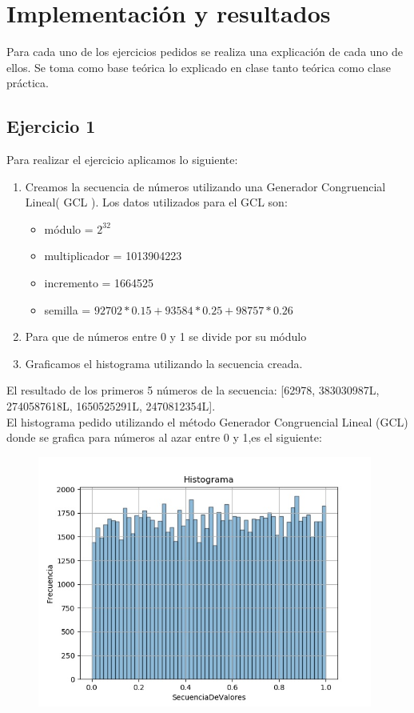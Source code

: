 \documentclass[11pt,a4paper]{article}
\begin{document}
\section{Implementación y resultados}
Para cada uno de los ejercicios pedidos se realiza una explicación de cada uno de ellos. Se toma como base teórica lo explicado en clase tanto teórica como clase práctica.

	\subsection{Ejercicio 1}
	    Para realizar el ejercicio aplicamos lo siguiente:
	    \begin{enumerate}
	        \item Creamos la secuencia de números utilizando una Generador Congruencial Lineal( GCL ). Los datos utilizados para el GCL son:
	            \begin{itemize}
	                \item módulo = $2^{32}$
	                \item multiplicador = 1013904223
	                \item incremento = 1664525
	                \item semilla = $92702*0.15+93584*0.25+98757*0.26$
	            \end{itemize}
	         \item Para que de números entre 0 y 1 se divide por su módulo
	         \item Graficamos el histograma utilizando la secuencia creada.
	         
	    \end{enumerate}
		El resultado de los primeros 5 números de la secuencia: [62978, 383030987L, 2740587618L, 1650525291L, 2470812354L].\\
		El histograma pedido utilizando el método Generador Congruencial Lineal (GCL) donde se grafica para números al azar entre 0 y 1,es el siguiente:
		\begin{figure}[H]
  			\centering
    			\includegraphics[width=11cm]{imagenes/histogramaEjer1}
		\end{figure}
\end{document}
